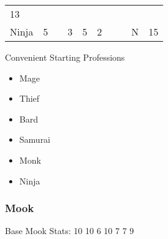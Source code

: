 \documentclass[12pt]{article}
\begin{document}
\begin{longtable}[]{@{}llllllllll@{}}
\begin{minipage}[t]{0.08\columnwidth}
13
\strut\end{minipage}\tabularnewline
\begin{minipage}[t]{0.13\columnwidth}\raggedright\strut
Ninja
\strut\end{minipage} &
\begin{minipage}[t]{0.06\columnwidth}\raggedright\strut
5
\strut\end{minipage} &
\begin{minipage}[t]{0.06\columnwidth}\raggedright\strut
\strut\end{minipage} &
\begin{minipage}[t]{0.06\columnwidth}\raggedright\strut
3
\strut\end{minipage} &
\begin{minipage}[t]{0.06\columnwidth}\raggedright\strut
5
\strut\end{minipage} &
\begin{minipage}[t]{0.06\columnwidth}\raggedright\strut
2
\strut\end{minipage} &
\begin{minipage}[t]{0.06\columnwidth}\raggedright\strut
\strut\end{minipage} &
\begin{minipage}[t]{0.06\columnwidth}\raggedright\strut
\strut\end{minipage} &
\begin{minipage}[t]{0.07\columnwidth}\raggedright\strut
N
\strut\end{minipage} &
\begin{minipage}[t]{0.08\columnwidth}\raggedright\strut
15
\strut\end{minipage}\tabularnewline
\bottomrule
\end{longtable}

Convenient Starting Professions

\begin{itemize}
\item
  Mage
\item
  Thief
\item
  Bard
\item
  Samurai
\item
  Monk
\item
  Ninja
\end{itemize}

\subsubsection{Mook}\label{mook}

Base Mook Stats: 10 10 6 10 7 7 9
\end{document}
